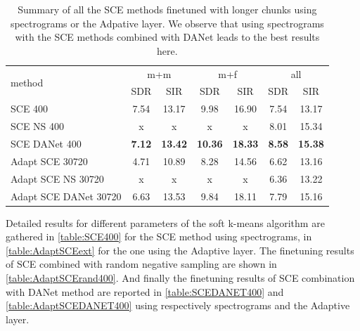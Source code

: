 \documentclass[master, tikz, final,11pt, dvipdfmx]{iscs-thesis}
\begin{document}
\begin{table}[h!]
\centering
\begin{tabular}{l|c|c|c|c|c|c}
\multirow{2}{*}{method} & \multicolumn{2}{c|}{m+m} & \multicolumn{2}{c|}{m+f} & \multicolumn{2}{c}{all} \\ 
\cline{2-7} 
 & SDR & SIR & SDR & SIR & SDR & SIR \\ 
\hline
SCE 400  & 7.54 & 13.17 & 9.98 & 16.90 & 7.54 & 13.17 \\
SCE NS 400 & x & x & x & x & 8.01 & 15.34 \\
SCE DANet 400 & \textbf{7.12} & \textbf{13.42} & \textbf{10.36} & \textbf{18.33} & \textbf{8.58} & \textbf{15.38} \\ 
\hline
\hline
Adapt SCE 30720  & 4.71 & 10.89 & 8.28 & 14.56 & 6.62 & 13.16 \\
Adapt SCE NS 30720 & x & x & x & x & 6.36 & 13.22 \\
Adapt SCE DANet 30720 & 6.63 & 13.53 & 9.84 & 18.11 & 7.79 & 15.16 \\ 

\end{tabular}
\caption[Summary of all the SCE methods finetuned with longer chunks using spectrograms or the Adpative layer]{Summary of all the SCE methods finetuned with longer chunks using spectrograms or the Adpative layer. We observe that using spectrograms with the SCE methods combined with DANet leads to the best results here.}
\label{table:SCE400recap}
\end{table}

Detailed results for different parameters of the soft k-means algorithm are gathered in \autoref{table:SCE400} for the SCE method using spectrograms, in \autoref{table:AdaptSCEext} for the one using the Adaptive layer. The finetuning results of SCE combined with random negative sampling are shown in \autoref{table:AdaptSCErand400}. And finally the finetuning results of SCE combination with DANet method are reported in \autoref{table:SCEDANET400} and \autoref{table:AdaptSCEDANET400} using respectively spectrograms and the Adaptive layer.
\end{document}
